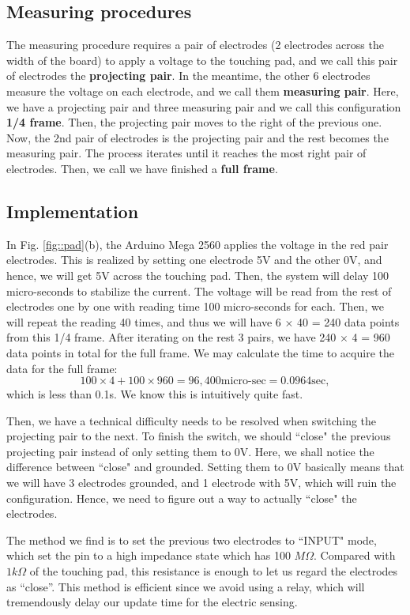 \documentclass[reprint,amsmath, amsfonts, amssymb, aps, letterpaper]{revtex4-1}
\begin{document}
\subsection{Measuring procedures}
The measuring procedure requires a pair of electrodes (2 electrodes across the width of the board) to apply a voltage to the touching pad, and we call this pair of electrodes the \textbf{projecting pair}. In the meantime, the other 6 electrodes measure the voltage on each electrode, and we call them \textbf{measuring pair}. Here, we have a projecting pair and three measuring pair and we call this configuration \textbf{1/4 frame}. Then, the projecting pair moves to the right of the previous one. Now, the 2nd pair of electrodes is the projecting pair and the rest becomes the measuring pair. The process iterates until it reaches the most right pair of electrodes. Then, we call we have finished a \textbf{full frame}.

\subsection{Implementation}
In Fig. \ref{fig::pad}(b), the Arduino Mega 2560 applies the voltage in the red pair electrodes. This is realized by setting one electrode 5V and the other 0V, and hence, we will get 5V across the touching pad. Then, the system will delay 100 micro-seconds to stabilize the current. The voltage will be read from the rest of electrodes one by one with reading time 100 micro-seconds for each. Then, we will repeat the reading 40 times, and thus we will have 6 $\times$ 40 = 240 data points from this 1/4 frame. After iterating on the rest 3 pairs, we have 240 $\times$ 4 = 960 data points in total for the full frame. We may calculate the time to acquire the data for the full frame:
\[ 100 \times 4 + 100 \times 960 = 96,400 \text{micro-sec}  = 0.0964 \text{sec},
\]
which is less than 0.1s. We know this is intuitively quite fast.

Then, we have a technical difficulty needs to be resolved when switching the projecting pair to the next. To finish the switch, we should ``close" the previous projecting pair instead of only setting them to 0V. Here, we shall notice the difference between ``close" and grounded. Setting them to 0V basically means that we will have 3 electrodes grounded, and 1 electrode with 5V, which will ruin the configuration. Hence, we need to figure out a way to actually ``close" the electrodes.

The method we find is to set the previous two electrodes to ``INPUT" mode, which set the pin to a high impedance state which has 100 $\si{M\Omega}$. Compared with $1\si{k\Omega}$ of the touching pad, this resistance is enough to let us regard the electrodes as ``close''. This method is efficient since we avoid using a relay, which will tremendously delay our update time for the electric sensing. 
\end{document}
